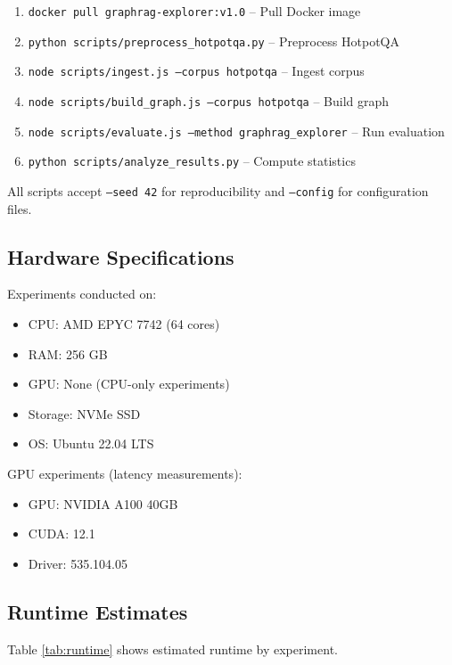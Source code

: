 \documentclass[conference]{IEEEtran}
\begin{document}
\begin{enumerate}
    \item \texttt{docker pull graphrag-explorer:v1.0} -- Pull Docker image
    \item \texttt{python scripts/preprocess\_hotpotqa.py} -- Preprocess HotpotQA
    \item \texttt{node scripts/ingest.js --corpus hotpotqa} -- Ingest corpus
    \item \texttt{node scripts/build\_graph.js --corpus hotpotqa} -- Build graph
    \item \texttt{node scripts/evaluate.js --method graphrag\_explorer} -- Run evaluation
    \item \texttt{python scripts/analyze\_results.py} -- Compute statistics
\end{enumerate}

All scripts accept \texttt{--seed 42} for reproducibility and \texttt{--config} for configuration files.

\subsection{Hardware Specifications}

Experiments conducted on:
\begin{itemize}
    \item CPU: AMD EPYC 7742 (64 cores)
    \item RAM: 256 GB
    \item GPU: None (CPU-only experiments)
    \item Storage: NVMe SSD
    \item OS: Ubuntu 22.04 LTS
\end{itemize}

GPU experiments (latency measurements):
\begin{itemize}
    \item GPU: NVIDIA A100 40GB
    \item CUDA: 12.1
    \item Driver: 535.104.05
\end{itemize}

\subsection{Runtime Estimates}

Table \ref{tab:runtime} shows estimated runtime by experiment.
\end{document}
